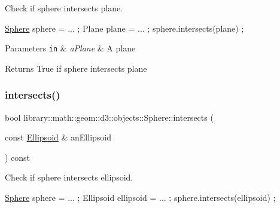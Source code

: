 Check if sphere intersects plane. 


\begin{DoxyCode}
\hyperlink{classlibrary_1_1math_1_1geom_1_1d3_1_1objects_1_1_sphere_a55dccc8ea16ee55cd7694c26afa8ea39}{Sphere} sphere = ... ;
Plane plane = ... ;
sphere.intersects(plane) ;
\end{DoxyCode}



\begin{DoxyParams}[1]{Parameters}
\mbox{\tt in}  & {\em a\+Plane} & A plane \\
\hline
\end{DoxyParams}
\begin{DoxyReturn}{Returns}
True if sphere intersects plane 
\end{DoxyReturn}
\mbox{\label{classlibrary_1_1math_1_1geom_1_1d3_1_1objects_1_1_sphere_ad278cbe34b3fde84126202d772f9df27}} 
\subsubsection{\texorpdfstring{intersects()}{intersects()}\hspace{0.1cm}{\footnotesize\ttfamily [7/9]}}
{\footnotesize\ttfamily bool library\+::math\+::geom\+::d3\+::objects\+::\+Sphere\+::intersects (\begin{DoxyParamCaption}\item[{const \hyperlink{classlibrary_1_1math_1_1geom_1_1d3_1_1objects_1_1_ellipsoid}{Ellipsoid} \&}]{an\+Ellipsoid }\end{DoxyParamCaption}) const}



Check if sphere intersects ellipsoid. 


\begin{DoxyCode}
\hyperlink{classlibrary_1_1math_1_1geom_1_1d3_1_1objects_1_1_sphere_a55dccc8ea16ee55cd7694c26afa8ea39}{Sphere} sphere = ... ;
Ellipsoid ellipsoid = ... ;
sphere.intersects(ellipsoid) ;
\end{DoxyCode}



